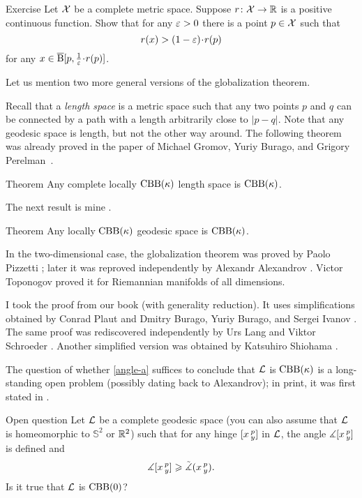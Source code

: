 \begin{thm}{Exercise}\label{ex:alm-min}
Let $\mathcal{X}$ be a complete metric space.
Suppose $r\colon\mathcal{X}\to \mathbb{R}$ is a positive continuous function.
Show that for any $\varepsilon>0$ there is a point $p\in \mathcal{X}$ such that 
\[r(x)> (1-\eps)\cdot r(p)\] 
for any $x\in \cBall[p,\tfrac{1}{\eps}\cdot r(p)]$.

\end{thm}

Let us mention two more general versions of the globalization theorem.

Recall that a \emph{length space} is a metric space such that any two points $p$ and $q$ can be connected by a path with a length arbitrarily close to $|p-q|$.
Note that any geodesic space is length, but not the other way around.
The following theorem was already proved in the paper of Michael Gromov, Yuriy Burago, and Grigory Perelman~\cite{burago-gromov-perelman}.

\begin{thm}{Theorem}
Any complete locally $\mathrm{CBB}(\kappa)$ length space is $\mathrm{CBB}(\kappa)$.

\end{thm}

The next result is mine \cite{petrunin:globalization}.

\begin{thm}{Theorem}\label{ex:noncomplete-globalization}
Any locally $\mathrm{CBB}(\kappa)$ geodesic space is $\mathrm{CBB}(\kappa)$.

\end{thm}

In the two-dimensional case,
the globalization theorem was proved by Paolo Pizzetti \cite{pizzetti};
later it was reproved independently by Alexandr Alexandrov \cite{alexandrov:devel}. %
Victor Toponogov \cite{toponogov-globalization+splitting} proved it for Riemannian manifolds of all dimensions.

I took the proof from our book \cite{alexander-kapovitch-petrunin-bigbook} (with generality reduction).
It uses simplifications obtained by Conrad Plaut \cite{plaut:dimension} and Dmitry Burago, Yuriy Burago, and Sergei Ivanov \cite{burago-burago-ivanov}.
The same proof was rediscovered independently by Urs Lang and Viktor Schroeder \cite{lang-schroeder:globalization}.
Another simplified version was obtained by
Katsuhiro Shiohama \cite{shiohama}.

The question of whether \ref{angle-a} suffices to conclude that $\mathcal{L}$ is $\mathrm{CBB}(\kappa)$ is a long-standing open problem (possibly dating back to Alexandrov);
in print, it was first stated in \cite[footnote in 4.1.5]{burago-burago-ivanov}.


\begin{thm}{Open question}\label{open:hinge-}
Let $\mathcal{L}$ be a complete geodesic space (you can also assume that $\mathcal{L}$ is homeomorphic to $\mathbb{S}^2$ or $\mathbb{R}^2$) 
such that for any hinge $[x\,{}^{p}_{y}]$ in $\mathcal{L}$, 
the angle $\measuredangle[x\,{}^{p}_{y}]$ is defined and 
\[\measuredangle[x\,{}^{p}_{y}]\geqslant\tilde\measuredangle(x\,{}^{p}_{y}).\]
Is it true that $\mathcal{L}$ is $\mathrm{CBB}(0)$?
\end{thm}




